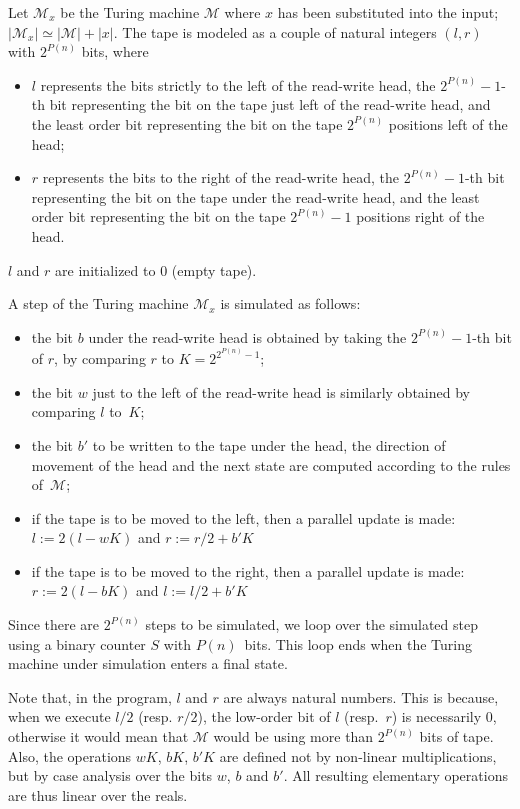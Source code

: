 \documentclass{llncs}
\newcommand{\calM}{\mathcal{M}}
\begin{document}
{Let $\calM_x$ be the Turing machine $\calM$ where $x$ has been
substituted into the input; $|\calM_x| \simeq |\calM| + |x|$.  The
tape is modeled as a couple of natural integers $(l,r)$ with
$2^{P(n)}$ bits, where
\begin{itemize}
\item $l$ represents the bits strictly to the left of the read-write
  head, the $2^{P(n)}-1$-th bit representing the bit on the tape just
  left of the read-write head, and the least order bit representing
  the bit on the tape $2^{P(n)}$ positions left of the head;
\item $r$ represents the bits to the right of the read-write head, the
  $2^{P(n)}-1$-th bit representing the bit on the tape under the
  read-write head, and the least order bit representing the bit on the
  tape $2^{P(n)}-1$ positions right of the head.
\end{itemize}
$l$ and $r$ are initialized to $0$ (empty tape).

A step of the Turing machine $\calM_x$ is simulated as follows:
\begin{itemize}
\item the bit $b$ under the read-write head is obtained by taking the
  $2^{P(n)}-1$-th bit of $r$, by comparing $r$ to $K =
  2^{2^{P(n)}-1}$;
\item the bit $w$ just to the left of the read-write head is similarly
  obtained by comparing $l$ to~$K$;
\item the bit $b'$ to be written to the tape under the head, the
  direction of movement of the head and the next state are computed
  according to the rules of~$\calM$;
\item if the tape is to be moved to the left, then a parallel update
  is made: $l:=2(l-wK)$ and $r:=r/2+b'K$
\item if the tape is to be moved to the right, then a parallel update
  is made: $r:=2(l-bK)$ and $l:=l/2+b'K$
\end{itemize}

Since there are $2^{P(n)}$ steps to be simulated, we loop over the
simulated step using a binary counter $S$ with $P(n)$~bits. This loop
ends when the Turing machine under simulation enters a final state.

Note that, in the program, $l$ and $r$ are always natural
numbers. This is because, when we execute $l/2$ (resp. $r/2$), the
low-order bit of $l$ (resp.~$r$) is necessarily $0$, otherwise it
would mean that $\calM$ would be using more than $2^{P(n)}$ bits of
tape. Also, the operations $wK$, $bK$, $b'K$ are defined not by
non-linear multiplications, but by case analysis over the bits $w$,
$b$ and $b'$. All resulting elementary operations are thus linear over
the reals.

}
\end{document}
